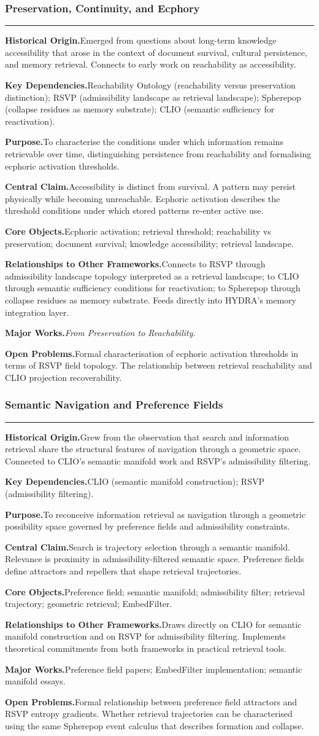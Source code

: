 \documentclass[12pt, twoside]{article}
\newcommand{\frameworkhead}[5]{  \subsubsection{#1}
  \noindent\textcolor{#2}{\rule{\linewidth}{0.8pt}}
  \smallskip

  \noindent\textbf{Historical Origin.}\quad #3

  \noindent\textbf{Key Dependencies.}\quad #4

  \noindent\textbf{Purpose.}\quad #5
}
\newcommand{\frameworkbody}[5]{  \noindent\textbf{Central Claim.}\quad #1

  \noindent\textbf{Core Objects.}\quad #2

  \noindent\textbf{Relationships to Other Frameworks.}\quad #3

  \noindent\textbf{Major Works.}\quad #4

  \noindent\textbf{Open Problems.}\quad #5
  \medskip
}
\begin{document}
\frameworkhead{Preservation, Continuity, and Ecphory}{formalismgray}{Emerged from questions about long-term knowledge accessibility that arose
in the context of document survival, cultural persistence, and memory
retrieval. Connects to early work on reachability as accessibility.}{Reachability Ontology (reachability versus preservation distinction); RSVP
(admissibility landscape as retrieval landscape); Spherepop (collapse
residues as memory substrate); CLIO (semantic sufficiency for reactivation).}{To characterise the conditions under which information remains retrievable
over time, distinguishing persistence from reachability and formalising
ecphoric activation thresholds.}
\frameworkbody{Accessibility is distinct from survival. A pattern may persist physically
while becoming unreachable. Ecphoric activation describes the threshold
conditions under which stored patterns re-enter active use.}{Ecphoric activation; retrieval threshold; reachability vs preservation;
document survival; knowledge accessibility; retrieval landscape.}{Connects to RSVP through admissibility landscape topology interpreted as a
retrieval landscape; to CLIO through semantic sufficiency conditions for
reactivation; to Spherepop through collapse residues as memory substrate.
Feeds directly into HYDRA's memory integration layer.}{\emph{From Preservation to Reachability}.}{Formal characterisation of ecphoric activation thresholds in terms of RSVP
field topology. The relationship between retrieval reachability and CLIO
projection recoverability.}

\frameworkhead{Semantic Navigation and Preference Fields}{formalismgray}{Grew from the observation that search and information retrieval share the
structural features of navigation through a geometric space. Connected to
CLIO's semantic manifold work and RSVP's admissibility filtering.}{CLIO (semantic manifold construction); RSVP (admissibility filtering).}{To reconceive information retrieval as navigation through a geometric
possibility space governed by preference fields and admissibility constraints.}
\frameworkbody{Search is trajectory selection through a semantic manifold. Relevance is
proximity in admissibility-filtered semantic space. Preference fields define
attractors and repellers that shape retrieval trajectories.}{Preference field; semantic manifold; admissibility filter; retrieval
trajectory; geometric retrieval; EmbedFilter.}{Draws directly on CLIO for semantic manifold construction and on RSVP for
admissibility filtering. Implements theoretical commitments from both
frameworks in practical retrieval tools.}{Preference field papers; EmbedFilter implementation; semantic manifold
essays.}{Formal relationship between preference field attractors and RSVP entropy
gradients. Whether retrieval trajectories can be characterised using the same
Spherepop event calculus that describes formation and collapse.}
\end{document}
